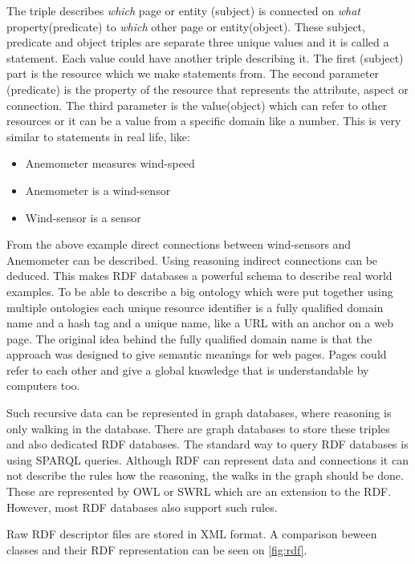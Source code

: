 The triple describes \textit{which} page or entity (subject) is connected on \textit{what} property(predicate) to \textit{which} other page or entity(object). These subject, predicate and object triples are separate three unique values and it is called a statement.
Each value could have another triple describing it. The first (subject) part is the resource  which we make statements from. The second parameter (predicate) is the property of the resource that represents the attribute, aspect or connection. The third parameter is the value(object) which can refer to other resources or it can be a value from a specific domain like a number. This is very similar to statements in real life, like:
\begin{itemize}
\item Anemometer measures wind-speed
\item Anemometer is a wind-sensor
\item Wind-sensor is a sensor
\end{itemize} 
From the above example direct connections between wind-sensors and Anemometer can be described. Using reasoning indirect connections can be deduced. This makes RDF databases a powerful schema to describe real world examples. To be able to describe a big ontology which were put together using multiple ontologies each unique resource identifier is a fully qualified domain name and a hash tag and a unique name, like a URL with an anchor on a web page. 
The original idea behind the fully qualified domain name is that the approach was designed to give semantic meanings for web pages. 
Pages could refer to each other and give a global knowledge that is understandable by computers too. 

Such recursive data can be represented in graph databases, where reasoning is only walking in the database. There are graph databases to store these triples and also dedicated RDF databases. The standard way to query RDF databases is using SPARQL queries. Although RDF can represent data and connections it can not describe the rules how the reasoning, the walks in the graph should be done. These are represented by OWL or SWRL which are an extension to the RDF. However, most RDF databases also support such rules.

Raw RDF descriptor files are stored in XML format. A comparison beween classes and their RDF representation can be seen on \ref{fig:rdf}.


